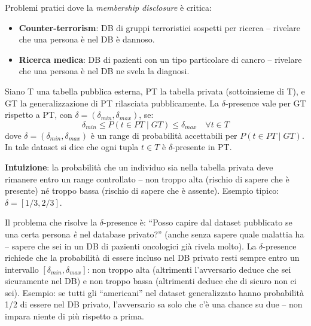 \documentclass[a4paper,11pt]{article}
\begin{document}
Problemi pratici dove la \emph{membership disclosure} \`{e} critica:
\begin{itemize}
  \item \textbf{Counter-terrorism}: DB di gruppi terroristici sospetti per ricerca -- rivelare che una persona \`{e} nel DB \`{e} dannoso.
  \item \textbf{Ricerca medica}: DB di pazienti con un tipo particolare di cancro -- rivelare che una persona \`{e} nel DB ne svela la diagnosi.
\end{itemize}

\begin{definizione}
Siano T una tabella pubblica esterna, PT la tabella privata (sottoinsieme di T), e GT la generalizzazione di PT rilasciata pubblicamente. La $\delta$-presence vale per GT rispetto a PT, con $\delta = (\delta_{min}, \delta_{max})$, se:
\[
\delta_{min} \leq P(t \in PT \mid GT) \leq \delta_{max} \quad \forall t \in T
\]
dove $\delta = (\delta_{min}, \delta_{max})$ \`{e} un range di probabilit\`{a} accettabili per $P(t \in PT \mid GT)$. In tale dataset si dice che ogni tupla $t \in T$ \`{e} $\delta$-presente in PT.

\textbf{Intuizione}: la probabilit\`{a} che un individuo sia nella tabella privata deve rimanere entro un range controllato -- non troppo alta (rischio di sapere che \`{e} presente) n\'{e} troppo bassa (rischio di sapere che \`{e} assente). Esempio tipico: $\delta = [1/3, 2/3]$.
\end{definizione}

\begin{nota}
Il problema che risolve la $\delta$-presence è: ``Posso capire dal dataset pubblicato se una certa persona \emph{è} nel database privato?'' (anche senza sapere quale malattia ha -- sapere che sei in un DB di pazienti oncologici già rivela molto). La $\delta$-presence richiede che la probabilità di essere incluso nel DB privato resti sempre entro un intervallo $[\delta_{min}, \delta_{max}]$: non troppo alta (altrimenti l'avversario deduce che sei sicuramente nel DB) e non troppo bassa (altrimenti deduce che di sicuro non ci sei). Esempio: se tutti gli ``americani'' nel dataset generalizzato hanno probabilità 1/2 di essere nel DB privato, l'avversario sa solo che c'è una chance su due -- non impara niente di più rispetto a prima.
\end{nota}
\end{document}

